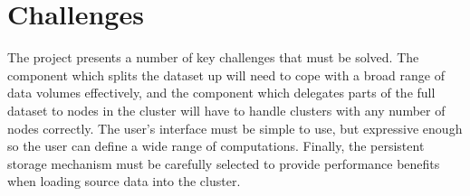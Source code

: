 \section{Challenges}
The project presents a number of key challenges that must be solved. The component which splits the dataset up will need to cope with a broad range of data volumes effectively, and the component which delegates parts of the full dataset to nodes in the cluster will have to handle clusters with any number of nodes correctly. The user's interface must be simple to use, but expressive enough so the user can define a wide range of computations. Finally, the persistent storage mechanism must be carefully selected to provide performance benefits when loading source data into the cluster.
